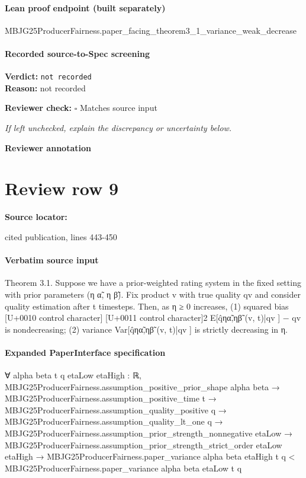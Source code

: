 \documentclass[10pt]{article}
\newcommand{\reviewerbox}{%
  \par\noindent\fbox{\parbox{0.96\linewidth}{\rule{0pt}{0.38in}}}\par
}
\newcommand{\reviewmatch}[1]{%
  \par\noindent\textbf{Reviewer check:} $\square$\; #1\par
  \noindent\emph{If left unchecked, explain the discrepancy or uncertainty below.}\par
}
\begin{document}
\paragraph{Lean proof endpoint (built separately)}\begin{ReviewVerbatim}
MBJG25ProducerFairness.paper_facing_theorem3_1_variance_weak_decrease
\end{ReviewVerbatim}

\paragraph{Recorded source-to-Spec screening}
\textbf{Verdict:} \texttt{not recorded}
\\
\textbf{Reason:} not recorded
\reviewmatch{Matches source input}
\noindent\textbf{Reviewer annotation}\par
\reviewerbox
\clearpage
\hypertarget{source-claim-976fc5a9912d46b4}{}
\section*{Review row 9}
\textbf{Source locator:} {\footnotesize\raggedright cited publication, lines 443-\allowbreak{}450\par}
\paragraph{Verbatim source input}
\begin{ReviewVerbatim}
Theorem 3.1. Suppose we have a prior-weighted rating system in the fixed setting with prior parameters (η α̃, η β̃). Fix
product v with true quality qv and consider quality estimation after t timesteps.
Then, as η
≥ 0 increases, (1) squared bias
[U+0010 control character]
[U+0011 control character]2
E[q̂ηα̃,ηβ̃ (v, t)|qv ] − qv
is nondecreasing; (2) variance Var[q̂ηα̃,ηβ̃ (v, t)|qv ] is strictly decreasing in η.
\end{ReviewVerbatim}


\paragraph{Expanded PaperInterface specification}
\begin{ReviewVerbatim}
∀ {alpha beta t q etaLow etaHigh : ℝ},
  MBJG25ProducerFairness.assumption_positive_prior_shape alpha beta →
    MBJG25ProducerFairness.assumption_positive_time t →
      MBJG25ProducerFairness.assumption_quality_positive q →
        MBJG25ProducerFairness.assumption_quality_lt_one q →
          MBJG25ProducerFairness.assumption_prior_strength_nonnegative etaLow →
            MBJG25ProducerFairness.assumption_prior_strength_strict_order etaLow etaHigh →
              MBJG25ProducerFairness.paper_variance alpha beta etaHigh t q <
                MBJG25ProducerFairness.paper_variance alpha beta etaLow t q
\end{ReviewVerbatim}
\end{document}
